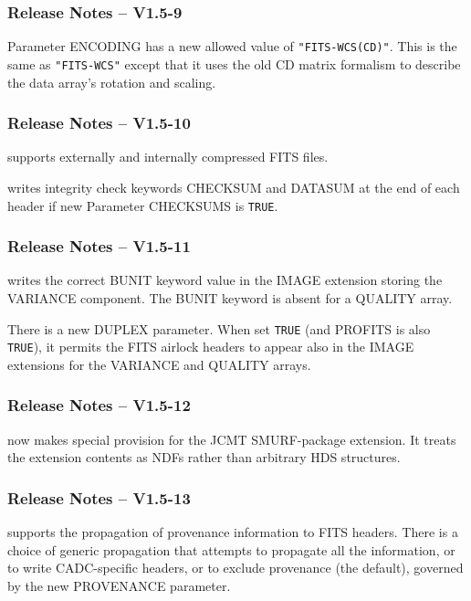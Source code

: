 \documentclass[twoside,11pt]{starlink}
\begin{document}
\subsubsection{Release Notes -- V1.5-9}

 Parameter ENCODING has a new allowed
value of \texttt{"FITS-WCS(CD)"}.  This is the same as
\texttt{"FITS-WCS"} except that it uses the old CD matrix formalism
to describe the data array's rotation and scaling.

\subsubsection{Release Notes -- V1.5-10}

 supports externally and internally compressed
FITS files.

 writes integrity check keywords CHECKSUM
and DATASUM at the end of each header if new Parameter CHECKSUMS is
\texttt{TRUE}.

\subsubsection{Release Notes -- V1.5-11}

 writes the correct BUNIT keyword value in
the IMAGE extension storing the VARIANCE component.  The BUNIT
keyword is absent for a QUALITY array.

There is a new DUPLEX parameter.  When set \texttt{TRUE} (and PROFITS
is also \texttt{TRUE}), it permits the FITS airlock headers to appear
also in the IMAGE extensions for the VARIANCE and QUALITY arrays.

\subsubsection{Release Notes -- V1.5-12}

 now makes special provision for the JCMT
SMURF-package extension.  It treats the extension contents as NDFs
rather than arbitrary HDS structures.

\subsubsection{Release Notes -- V1.5-13}

 supports the propagation of provenance
information to FITS headers.  There is a choice of generic propagation
that attempts to propagate all the information, or to write
CADC-specific headers, or to exclude provenance (the default),
governed by the new PROVENANCE parameter.
\end{document}
